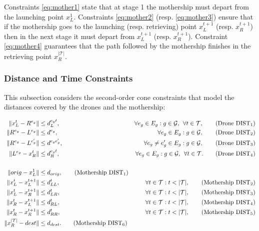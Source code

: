 \documentclass[10pt,a4paper]{elsarticle}
\newcommand{\EN}[1]{{\color{black}#1}}
\begin{document}
\noindent
Constraints \eqref{eq:mother1} state that at stage 1 the mothership must depart from the launching point $x_L^1$. Constraints \eqref{eq:mother2} (resp. \eqref{eq:mother3}) ensure that if the mothership go\EN{es} to the launching (resp. retrieving) point $x_L^{t+1}$ (resp. $x_R^{t+1}$) then in the next stage it must depart from $x_L^{t+1}$ (resp. $x_R^{t+1}$). Constraint \eqref{eq:mother4} guarantee\EN{s} that the path followed by the mothership finishes in the retrieving point $x_R^{|\mathcal T|}$.


\subsubsection*{Distance and Time Constraints}
\noindent
This subsection considers the second-order cone constraints that model the distances covered by the drones and the mothership:

\begin{align*}
\|x_L^t- R^{e_g}\| & \leq  d_L^{e_gt},  &\forall e_g\in E_g:g\in \mathcal{G}, \:\:\forall t\in \mathcal T, \tag{Drone DIST$_{1}$} \label{eq:drone-d1-async}\\
\|R^{e_g}- L^{e_g}\| & \leq  d^{e_g},  &\forall e_g\in E_g:g\in \mathcal{G}, \tag{Drone DIST$_{2}$} \label{eq:drone-d2-async}\\
\|R^{e_g}- L^{e'_g}\| & \leq  d^{e_ge'_g}, &\forall e_g\neq e_g'\in E_g:g\in \mathcal{G}, \tag{Drone DIST$_{3}$} \label{eq:drone-d3-async}\\
\|L^{e_g}- x_R^t\| & \leq  d_R^{e_gt}, &\forall e_g\in E_g:g\in \mathcal{G},\:\:\forall t\in \mathcal T. \tag{Drone DIST$_{4}$} \label{eq:drone-d4-async}\\\\
\|orig - x_L^1\| & \leq d_{orig}, \tag{Mothership DIST$_1$}\label{eq:mothership-d1-async}\\
\|x_L^t - x_L^{t+1}\| & \leq d_{LL}^{t}, &\forall t\in\mathcal T:t<|\mathcal T|, \tag{Mothership DIST$_{2}$}\label{eq:mothership-d2-async}\\
\|x_L^t - x_R^{t+1}\| & \leq d_{LR}^{t}, &\forall t\in\mathcal T:t<|\mathcal T|, \tag{Mothership DIST$_{3}$}\label{eq:mothership-d3-async}\\
\|x_R^t - x_L^{t+1}\| & \leq d_{RL}^{t}, &\forall t\in\mathcal T:t<|\mathcal T|, \tag{Mothership DIST$_{4}$}\label{eq:mothership-d4-async}\\
\|x_R^t - x_R^{t+1}\| & \leq d_{RR}^{t}, &\forall t\in\mathcal T:t<|\mathcal T|, \tag{Mothership DIST$_{5}$}\label{eq:mothership-d5-async}\\
\|x_R^{|\mathcal T|} - dest\| & \leq d_{dest}. \tag{Mothership DIST$_6$}\label{eq:mothership-d6-async}
\end{align*}
\end{document}
